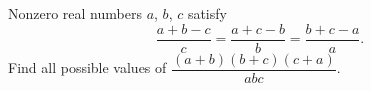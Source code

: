 Nonzero real numbers $a$, $b$, $c$ satisfy
\[
\dfrac{a+b-c}{c}=\dfrac{a+c-b}{b}=\dfrac{b+c-a}{a}.
\]
Find all possible values of $\dfrac{(a+b)(b+c)(c+a)}{abc}$.
